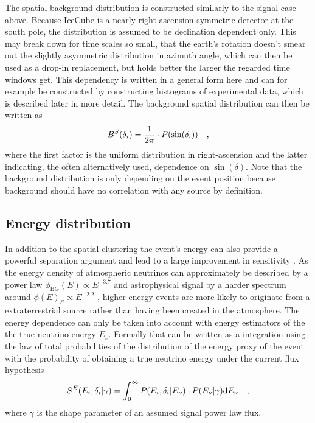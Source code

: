 The spatial background distribution is constructed similarly to the signal case above.
Because IceCube is a nearly right-ascension symmetric detector at the south pole, the distribution is assumed to be declination dependent only.
This may break down for time scales so small, that the earth's rotation doesn't smear out the slightly asymmetric distribution in azimuth angle, which can then be used as a drop-in replacement, but holds better the larger the regarded time windows get.
This dependency is written in a general form here and can for example be constructed by constructing histograms of experimental data, which is described later in more detail.
The background spatial distribution can then be written as
\begin{equation}
  B^S(\delta_i) = \frac{1}{2\pi} \cdot P(\sin(\delta_i))
  \quad\text{,}
\end{equation}
where the first factor is the uniform distribution in right-ascension and the latter indicating, the often alternatively used, dependence on $\sin(\delta)$.
Note that the background distribution is only depending on the event position because background should have no correlation with any source by definition.

\subsection{Energy distribution}
In addition to the spatial clustering the event's energy can also provide a powerful separation argument and lead to a large improvement in sensitivity .
As the energy density of atmospheric neutrinos can approximately be described by a power law $\phi_\mathrm{BG}(E) \propto E^{-3.7}$ and astrophysical signal by a harder spectrum around $\phi(E)_S \propto E^{-2.2}$ , higher energy events are more likely to originate from a extraterrestrial source rather than having been created in the atmosphere.
The energy dependence can only be taken into account with energy estimators of the the true neutrino energy $E_\nu$.
Formally that can be written as a integration using the law of total probabilities of the distribution of the energy proxy of the event with the probability of obtaining a true neutrino energy under the current flux hypothesis
\begin{equation}
  S^E(E_i, \delta_i|\gamma) =
    \int_0^\infty P(E_i,\delta_i|E_\nu)\cdot P(E_\nu|\gamma) \mathrm{d}E_\nu
    \quad\text{,}
\end{equation}
where $\gamma$ is the shape parameter of an assumed signal power law flux.

